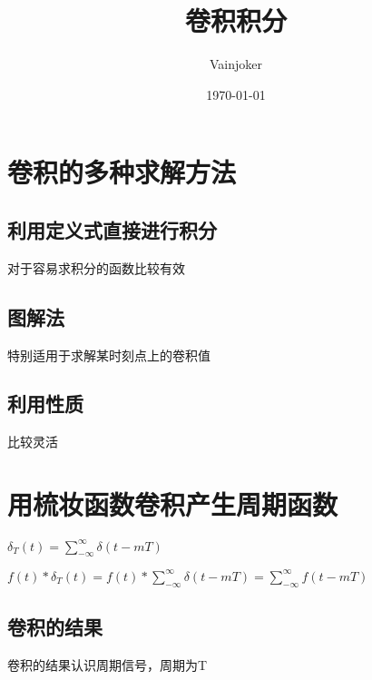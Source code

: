 \documentclass{article}
\title{卷积积分}
\author{Vainjoker}
\date{\today}
\begin{document}
    \maketitle
    \newpage
   
\section{卷积的多种求解方法}

\subsection{利用定义式直接进行积分}

对于容易求积分的函数比较有效
\subsection{图解法}

特别适用于求解某时刻点上的卷积值
\subsection{利用性质}

比较灵活
 
\section{用梳妆函数卷积产生周期函数}
$\delta_T(t)=\sum_{-\infty}^{\infty}\delta(t-mT)$

$f(t)*\delta_T(t)=f(t)*\sum_{-\infty}^{\infty}\delta(t-mT)=\sum_{-\infty}^{\infty}f(t-mT)$

\subsection{卷积的结果}

卷积的结果认识周期信号，周期为T
\end{document}
